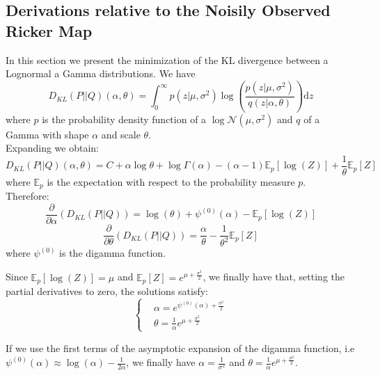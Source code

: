 \documentclass[12pt]{article}
\begin{document}
\begin{appendices}
	\section{Derivations relative to the Noisily Observed Ricker Map} \label{KLRicker}
	In this section we present the minimization of the KL divergence between a Lognormal a Gamma distributions.
	We have
	\begin{equation*}
	D_{KL}(P||Q)(\alpha, \theta) = \int_{0}^{\infty}{p(z|\mu, \sigma^2)\log(\frac{p(z|\mu, \sigma^2)}{q(z|\alpha, \theta)})\mathrm{d}z}
	\end{equation*}
	where $p$ is the probability density function of a $\log\mathcal{N}(\mu, \sigma^2)$ and $q$ of a Gamma with shape $\alpha$ and scale $\theta$. \\
	Expanding we obtain:
	\begin{equation*}
	D_{KL}(P||Q)(\alpha, \theta) = C + \alpha\log\theta + \log\Gamma(\alpha) - (\alpha-1)\mathbb{E}_p[\log(Z)] + \frac{1}{\theta}\mathbb{E}_p[Z]
	\end{equation*}
	where $\mathbb{E}_p$ is the expectation with respect to the probability measure $p$.\\
	Therefore:
	\begin{equation*}
	\frac{\partial }{\partial \alpha}(D_{KL}(P||Q)) = \log(\theta) + \psi^{(0)}(\alpha)-\mathbb{E}_p[\log(Z)]
	\end{equation*}
	\begin{equation*}
	\frac{\partial }{\partial \theta}(D_{KL}(P||Q)) = \frac{\alpha}{\theta} - \frac{1}{\theta^2}\mathbb{E}_p[Z]
	\end{equation*}
	where $\psi^{(0)}$ is the digamma function.
	
	Since $\mathbb{E}_p[\log(Z)]=\mu$ and $\mathbb{E}_p[Z] = e^{\mu+\frac{\sigma^2}{2}}$, we finally have that, setting the partial derivatives to zero, the solutions satisfy:
	\[	\begin{cases}
	& \alpha=e^{\psi^{(0)}(\alpha)+\frac{\sigma^2}{2}} \\
	& \theta=\frac{1}{\alpha}e^{\mu+\frac{\sigma^2}{2}}
	\end{cases}\]
	
	If we use the first terms of the asymptotic expansion of the digamma function, i.e $\psi^{(0)}(\alpha) \approx \log(\alpha)-\frac{1}{2\alpha}$, we finally have $\alpha =\frac{1}{\sigma^2}$ and $\theta=\frac{1}{\alpha}e^{\mu+\frac{\sigma^2}{2}}$. \\
	

\end{appendices}
\end{document}
